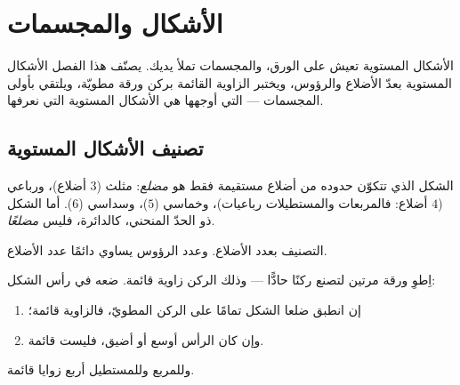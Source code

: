 \chapter{الأشكال والمجسمات}\label{ch:g2:shapes}

الأشكال المستوية تعيش على الورق، والمجسمات تملأ يديك. يصنّف هذا
الفصل الأشكال المستوية بعدّ الأضلاع والرؤوس، ويختبر الزاوية
القائمة بركن ورقة مطويّة، ويلتقي بأولى المجسمات ---
التي أوجهها هي الأشكال المستوية التي نعرفها.

\section{تصنيف الأشكال المستوية}

\begin{definition}\label{def:g2:shapes:sort}
الشكل الذي تتكوّن حدوده من أضلاع مستقيمة فقط هو
\emph{مضلع}: مثلث ($3$ أضلاع)، ورباعي ($4$ أضلاع:
فالمربعات والمستطيلات رباعيات)، وخماسي ($5$)،
وسداسي ($6$). أما الشكل ذو الحدّ المنحني، كالدائرة، فليس
\emph{مضلعًا}.
\end{definition}

\begin{omfigure}

{\small التصنيف بعدد الأضلاع. وعدد الرؤوس يساوي دائمًا
عدد الأضلاع.}
\end{omfigure}

\begin{method}\label{met:g2:shapes:rightangle}
اِطوِ ورقة مرتين لتصنع ركنًا حادًّا --- وذلك الركن زاوية قائمة.
ضعه في رأس الشكل:
\begin{enumerate}
  \item إن انطبق ضلعا الشكل تمامًا على الركن المطويّ، فالزاوية
        قائمة؛
  \item وإن كان الرأس أوسع أو أضيق، فليست قائمة.
\end{enumerate}
وللمربع وللمستطيل أربع زوايا قائمة.
\end{method}

